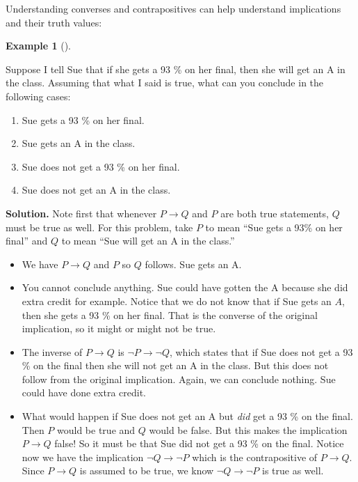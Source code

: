 \documentclass[10pt,]{book}
\theoremstyle{plain}
\theoremstyle{definition}
\newtheorem{example}[theorem]{Example}
\theoremstyle{definition}
\theoremstyle{definition}
\numberwithin{equation}{section}
\def\imp{\rightarrow}
\begin{document}
      Understanding converses and contrapositives can help understand implications and their truth values:
\begin{example}[]\label{example-6}

          Suppose I tell Sue that if she gets a 93
          \% on her final, then she will get an A in the class. Assuming that what I said is true, what can you conclude in the following cases:
\leavevmode%
\begin{enumerate}
\item\hypertarget{li-38}{}Sue gets a 93
            \% on her final.\item\hypertarget{li-39}{}Sue gets an A in the class.\item\hypertarget{li-40}{}Sue does not get a 93
            \% on her final.\item\hypertarget{li-41}{}Sue does not get an A in the class.\end{enumerate}
\par\medskip\noindent%
\textbf{Solution.}\quad 
          Note first that whenever \(P \imp Q\) and \(P\) are both true statements, \(Q\) must be true as well. For this problem, take \(P\) to mean ``Sue gets a 93\% on her final'' and \(Q\) to mean ``Sue will get an A in the class.''
\leavevmode%
\begin{itemize}[label=\textbullet]
\item{}We have \(P \imp Q\) and \(P\) so \(Q\) follows. Sue gets an A.\item{}You cannot conclude anything. Sue could have gotten the A because she did extra credit for example. Notice that we do not know that if Sue gets an \(A\), then she gets a 93
            \% on her final. That is the converse of the original implication, so it might or might not be true.\item{}The inverse of \(P \imp Q\) is \(\neg P \imp \neg Q\), which states that if Sue does not get a 93
            \% on the final then she will not get an A in the class. But this does not follow from the original implication. Again, we can conclude nothing. Sue could have done extra credit.\item{}What would happen if Sue does not get an A but \emph{did} get a 93 \% on the final. Then \(P\) would be true and \(Q\) would be false. But this makes the implication \(P \imp Q\) false! So it must be that Sue did not get a 93
            \% on the final. Notice now we have the implication \(\neg Q \imp \neg P\) which is the contrapositive of \(P \imp Q\). Since \(P \imp Q\) is assumed to be true, we know \(\neg Q \imp \neg P\) is true as well.\end{itemize}
\end{example}
\par
\end{document}

